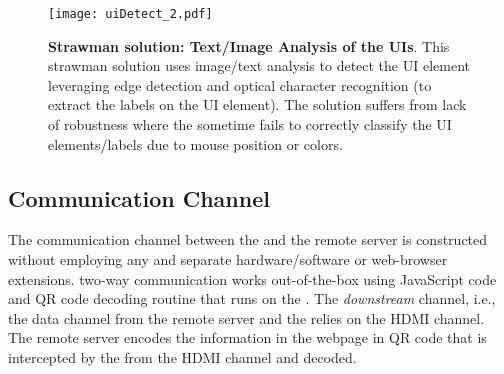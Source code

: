 \iffalse
\subsection{Initialization} 
\label{sec:systemDesign:init}

There are two steps of initialization process: 

\begin{mylist}
  \item\textbf{IO initialization.} The \device initializes the mouse by instructing the host system to move the mouse pointer to the top right corner (moving to the first right and then up for an arbitrarily large value). As the \device has access to the frames that are displayed on the screen, it can verify if the mouse pointer is at the top-right corner of the screen or not. Then it instructs the host OS to bring it to the center of the screen.
  
  \item\textbf{Network initialization.} The \device connects to the remote server using \webusb or \webbt, effectively using the host as an untrusted transport. The \device and the server establishes a secure channel with the public certificates that are distributed before-hand.
\end{mylist}
\fi


\begin{figure}[t]
\centering
\texttt{[image: uiDetect\_2.pdf]}
\caption{\textbf{Strawman solution: Text/Image Analysis of the UIs}. This strawman solution uses image/text analysis to detect the UI element leveraging edge detection and optical character recognition (to extract the labels on the UI element). The solution suffers from lack of robustness where the \device sometime fails to correctly classify the UI elements/labels due to mouse position or colors.}
\label{fig:uiDetect}
\centering
\end{figure}


\iffalse
\subsection{Communication Channel}
\label{sec:systemDesign:communicationChannel}

The communication channel between the \device and the remote server is constructed without employing any and separate hardware/software or web-browser extensions. \name two-way communication works out-of-the-box using JavaScript code and QR code decoding routine that runs on the \device. The \emph{downstream} channel, i.e., the data channel from the remote server and the \device relies on the HDMI channel. The remote server encodes the information in the webpage in QR code that is intercepted by the \device from the HDMI channel and decoded.

